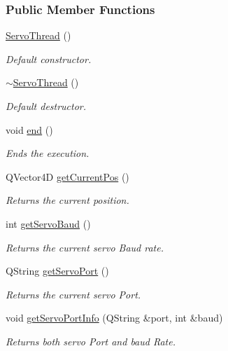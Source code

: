 \subsubsection*{Public Member Functions}
\begin{DoxyCompactItemize}
\item 
\hyperlink{a00009_af021de9817b11968dd627186e9e05a71}{Servo\+Thread} ()
\begin{DoxyCompactList}\small\item\em Default constructor. \end{DoxyCompactList}\item 
\hyperlink{a00009_a0c7ac1f603a247eac91d9780ad50f5fa}{$\sim$\+Servo\+Thread} ()
\begin{DoxyCompactList}\small\item\em Default destructor. \end{DoxyCompactList}\item 
void \hyperlink{a00009_aaa273318ffee5ba270cdaacba3f263f8}{end} ()
\begin{DoxyCompactList}\small\item\em Ends the execution. \end{DoxyCompactList}\item 
Q\+Vector4\+D \hyperlink{a00009_a19ad0fe74d9f35220bf2864dbcecce2a}{get\+Current\+Pos} ()
\begin{DoxyCompactList}\small\item\em Returns the current position. \end{DoxyCompactList}\item 
int \hyperlink{a00009_af2c9e71c33e15937e72703d859cd7147}{get\+Servo\+Baud} ()
\begin{DoxyCompactList}\small\item\em Returns the current servo Baud rate. \end{DoxyCompactList}\item 
Q\+String \hyperlink{a00009_a3fae25aeac390640192ceb38e32dae40}{get\+Servo\+Port} ()
\begin{DoxyCompactList}\small\item\em Returns the current servo Port. \end{DoxyCompactList}\item 
void \hyperlink{a00009_afcf834d93f1ac9663d6ebaab820e5f74}{get\+Servo\+Port\+Info} (Q\+String \&port, int \&baud)
\begin{DoxyCompactList}\small\item\em Returns both servo Port and baud Rate. \end{DoxyCompactList}\item 

\end{DoxyCompactItemize}
